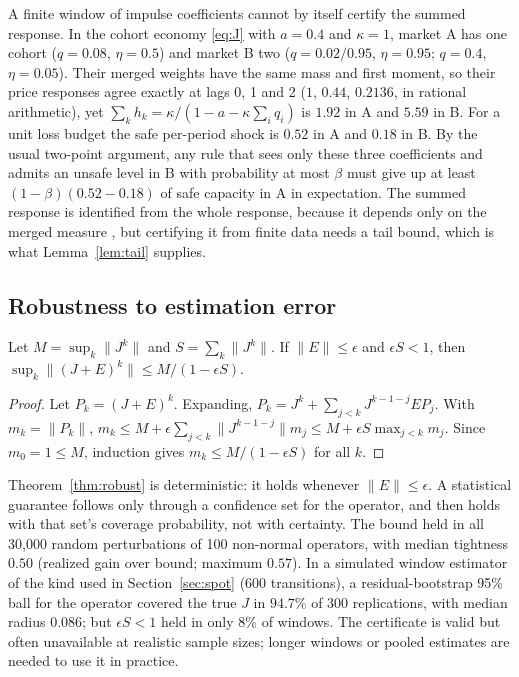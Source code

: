 \begin{remark}\label{rem:witness}
A finite window of impulse coefficients cannot by itself certify the summed response. In the cohort economy \eqref{eq:J} with $a=0.4$ and $\kappa=1$, market A has one cohort ($q=0.08$, $\eta=0.5$) and market B two ($q=0.02/0.95$, $\eta=0.95$; $q=0.4$, $\eta=0.05$). Their merged weights have the same mass and first moment, so their price responses agree exactly at lags 0, 1 and 2 ($1$, $0.44$, $0.2136$, in rational arithmetic), yet $\sum_kh_k=\kappa/(1-a-\kappa\sum_iq_i)$ is $1.92$ in A and $5.59$ in B. For a unit loss budget the safe per-period shock is $0.52$ in A and $0.18$ in B. By the usual two-point argument, any rule that sees only these three coefficients and admits an unsafe level in B with probability at most $\beta$ must give up at least $(1-\beta)(0.52-0.18)$ of safe capacity in A in expectation. The summed response is identified from the whole response, because it depends only on the merged measure \citep{niroula2026}, but certifying it from finite data needs a tail bound, which is what Lemma~\ref{lem:tail} supplies.
\end{remark}

\subsection{Robustness to estimation error}

\begin{theorem}\label{thm:robust}
Let $M=\sup_k\|J^k\|$ and $S=\sum_k\|J^k\|$. If $\|E\|\le\epsilon$ and $\epsilon S<1$, then $\sup_k\|(J+E)^k\|\le M/(1-\epsilon S)$.
\end{theorem}

\begin{proof}
Let $P_k=(J+E)^k$. Expanding, $P_k=J^k+\sum_{j<k}J^{k-1-j}EP_j$. With $m_k=\|P_k\|$, $m_k\le M+\epsilon\sum_{j<k}\|J^{k-1-j}\|m_j\le M+\epsilon S\max_{j<k}m_j$. Since $m_0=1\le M$, induction gives $m_k\le M/(1-\epsilon S)$ for all $k$.
\end{proof}

Theorem~\ref{thm:robust} is deterministic: it holds whenever $\|E\|\le\epsilon$. A statistical guarantee follows only through a confidence set for the operator, and then holds with that set's coverage probability, not with certainty. The bound held in all 30,000 random perturbations of 100 non-normal operators, with median tightness $0.50$ (realized gain over bound; maximum $0.57$). In a simulated window estimator of the kind used in Section~\ref{sec:spot} (600 transitions), a residual-bootstrap 95\% ball for the operator covered the true $J$ in $94.7\%$ of 300 replications, with median radius $0.086$; but $\epsilon S<1$ held in only $8\%$ of windows. The certificate is valid but often unavailable at realistic sample sizes; longer windows or pooled estimates are needed to use it in practice.

